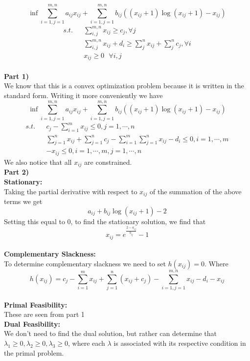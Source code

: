 \documentclass[12pt,letter]{article}
\newcommand{\ppart}[1]{\vspace{2mm}\large\textbf{\\Part {#1})\vspace{2mm}}\normalsize\\}
\newcommand{\condition}[1]{\vspace{1mm}\textbf{{#1}:}\normalsize\\}
\begin{document}
\[
    \inf\sum\limits_{i=1,j=1}^{m,n}a_{ij}x_{ij} 
        + \sum\limits_{i=1,j=1}^{m,n}b_{ij}((x_{ij} + 1)\log(x_{ij} + 1) - x_{ij})
\]
\vspace{-0.7cm}
\begin{align*}
    s.t. && \sum\limits_{i,j}^{m,n} x_{ij} \geq c_j, \forall j\\
         && \sum\limits_{i,j}^{m,n} x_{ij} + d_i \geq \sum\limits_j^n x_{ij} 
            + \sum\limits_j^nc_j, \forall i\\
         && x_{ij} \geq 0\textsf{ } \forall i,j
\end{align*}
\ppart{1}
We know that this is a convex optimization problem because it is written in the 
standard form. Writing it more conveniently we have
\[
    \inf\sum\limits_{i=1,j=1}^{m,n}a_{ij}x_{ij} 
        + \sum\limits_{i=1,j=1}^{m,n}b_{ij}((x_{ij} + 1)\log(x_{ij} + 1) - x_{ij})
\]
\vspace{-0.7cm}
\begin{align*}
    s.t. && c_j - \sum\limits_{i=1}^mx_{ij} \leq 0, j=1,\cdots,n\\
         && \sum\limits_{j=1}^n x_{ij} + \sum\limits_{j=1}^n c_j
            - \sum\limits_{i=1}^m\sum\limits_{j=1}^n x_{ij} - d_i \leq 0 
            ,i=1,\cdots,m\\
         && -x_{ij} \leq 0, i=1,\cdots,m, j=1,\cdots,n
\end{align*}
We also notice that all $x_{ij}$ are constrained.
\ppart{2}
\condition{Stationary}
Taking the partial derivative with respect to $x_{ij}$ of the summation of the 
above terms we get
\[
    a_{ij} + b_{ij}\log(x_{ij}+1) - 2
\]
Setting this equal to 0, to find the stationary solution, we find that
\[
    x_{ij} = e^{\frac{2-a_{ij}}{b_{ij}}}-1
\]
\\
\condition{Complementary Slackness}
To determine complementary slackness we need to set $h(x_{ij}) = 0$. Where
\[
    h(x_{ij}) = c_j - \sum\limits_{i=1}^mx_{ij} + \sum\limits_{j=1}^n(x_{ij} + c_j)
     - \sum\limits_{i=1,j=1}^{m,n}x_{ij} - d_i -x_{ij}
 \]
\\
\condition{Primal Feasibility}
These are seen from part 1
\\
\condition{Dual Feasibility}
We don't need to find the dual solution, but rather can determine that 
$\lambda_1\geq0, \lambda_2\geq0, \lambda_3\geq0$, where each $\lambda$ is associated
with its respective condition in the primal problem. 
\end{document}
